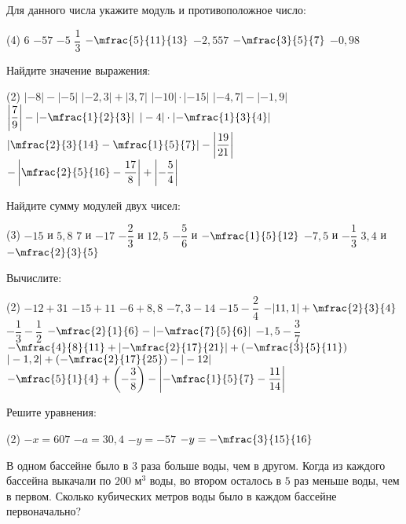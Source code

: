 \begin{class}[number=4]
	\begin{listofex}
		\item Для данного числа укажите модуль и противоположное число:
		\begin{tasks}(4)
			\task \( 6 \)
			\task \( -57 \)
			\task \( -5 \)
			\task \( \dfrac{1}{3} \)
			\task \( -\mfrac{5}{11}{13} \)
			\task \( -2,557 \)
			\task \( -\mfrac{3}{5}{7} \)
			\task \( -0,98 \)
		\end{tasks}
		\item Найдите значение выражения:
		\begin{tasks}(2)
			\task \( |-8|-|-5| \)
			\task \( |-2,3|+|3,7|  \)
			\task \(  |-10|\cdot|-15| \)
			\task \( |-4,7|-|-1,9| \)
			\task \( \left|\dfrac{7}{9}\right|-\left|-\mfrac{1}{2}{3}\right| \)
			\task \( |-4|\cdot\left|-\mfrac{1}{3}{4}\right| \)
			\task \( \left|\mfrac{2}{3}{14}-\mfrac{1}{5}{7}\right|-\left|\dfrac{19}{21}\right| \)
			\task \( -\left|\mfrac{2}{5}{16}-\dfrac{17}{8}\right|+\left|-\dfrac{5}{4}\right| \)
		\end{tasks}
		\item Найдите сумму модулей двух чисел:
		\begin{tasks}(3)
			\task \( -15 \) и \( 5,8 \)
			\task \( 7 \) и \( -17 \)
			\task \( -\dfrac{2}{3} \) и \( 12,5 \)
			\task \( -\dfrac{5}{6} \) и \( -\mfrac{1}{5}{12} \)
			\task \( -7,5 \) и \( -\dfrac{1}{3} \)
			\task \( 3,4 \) и \( -\mfrac{2}{3}{5} \)
		\end{tasks}
		\item Вычислите:
		\begin{tasks}(2)
			\task \( -12 + 31 \)
			\task \( -15+11 \)
			\task \( -6+8,8 \)
			\task \( -7,3-14 \)
			\task \( -15-\dfrac{2}{4} \)
			\task \( -|11,1|+\mfrac{2}{3}{4} \)
			\task \( -\dfrac{1}{3}-\dfrac{1}{2} \)
			\task \( -\mfrac{2}{1}{6}-\left|-\mfrac{7}{5}{6}\right| \)
			\task \( -1,5-\dfrac{3}{7} \)
			\task \( -\mfrac{4}{8}{11}+\left|-\mfrac{2}{17}{21}\right|+\left(-\mfrac{3}{5}{11}\right) \)
			\task \( |-1,2| + \left(-\mfrac{2}{17}{25}\right) - |-12| \)
			\task \( -\mfrac{5}{1}{4} + \left(-\dfrac{3}{8}\right) - \left|-\mfrac{1}{5}{7}-\dfrac{11}{14}\right| \)
		\end{tasks}
		\item Решите уравнения:
		\begin{tasks}(2)
			\task \( -x=607 \)
			\task \( -a=30,4 \)
			\task \( -y=-57 \)
			\task \( -y=-\mfrac{3}{15}{16} \)
		\end{tasks}
		\item В одном бассейне было в \(3\) раза больше воды, чем в другом. Когда из каждого бассейна выкачали по \(200\) м\(^3\) воды, во втором осталось в \(5\) раз меньше воды, чем в первом. Сколько кубических метров воды было в каждом бассейне первоначально?
	\end{listofex}
\end{class}

